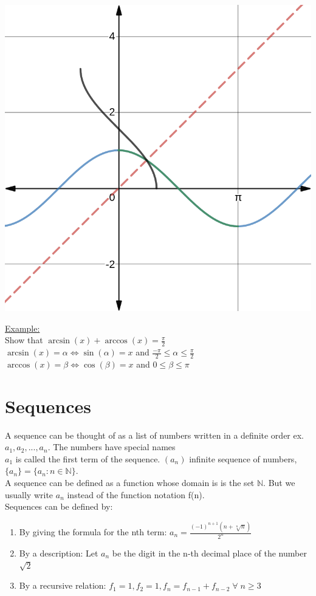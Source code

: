 \documentclass{article}
\begin{document}
	\begin{center}\includegraphics[scale=0.25]{3.png}\end{center}
 	\underline{Example: }\\
 	Show that $\arcsin(x) + \arccos(x) = \frac{\pi}{2}$\\
 	$\arcsin(x) = \alpha \Leftrightarrow \sin(\alpha) = x$ and $\frac{-\pi}{2} \leq \alpha \leq \frac{\pi}{2}$ \\
 	$\arccos(x) = \beta \Leftrightarrow \cos(\beta) = x$ and $0 \leq \beta \leq \pi$ \\
 	\section{Sequences}
 	A sequence can be thought of as a list of numbers written in a definite order ex. $a_1, a_2, ..., a_n$. The numbers have special names\\ $a_1$ is called the first term of the sequence. $(a_n)$ infinite sequence of numbers, $\{a_n\} = \{a_n: n \in\mathbb{N} \}$. \\
 	A sequence can be defined as a function whose domain is is the set $\mathbb{N}$. But we usually write $a_n$ instead of the function notation f(n).\\
 	Sequences can be defined by: 
 	\begin{enumerate}
 		\item By giving the formula for the nth term: $a_n = \frac{(-1)^{n+1}(n+\sqrt[n]{n})}{2^n}$
 		\item By a description: Let $a_n$ be the digit in the n-th decimal place of the number $\sqrt{2}$
 		\item By a recursive relation: $f_1 = 1, f_2 = 1, f_n = f_{n-1} + f_{n-2}\; \forall \; n \geq 3$
 	\end{enumerate}
 \pagebreak
\end{document}
